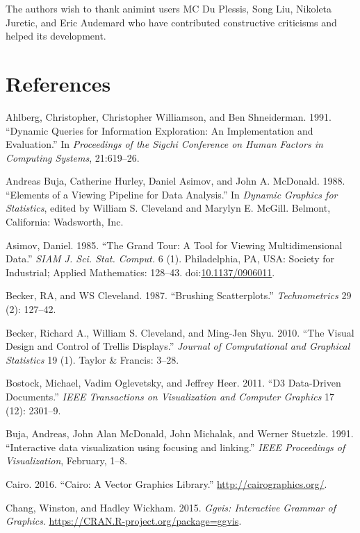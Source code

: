 \documentclass[12pt,]{article}
\theoremstyle{definition}
\theoremstyle{definition}
\theoremstyle{remark}
\begin{document}
The authors wish to thank animint users MC Du Plessis, Song Liu,
Nikoleta Juretic, and Eric Audemard who have contributed constructive
criticisms and helped its development.

\section*{References}

\hypertarget{refs}{}
\hypertarget{ref-Ahlberg:1991}{}
Ahlberg, Christopher, Christopher Williamson, and Ben Shneiderman. 1991.
``Dynamic Queries for Information Exploration: An Implementation and
Evaluation.'' In \emph{Proceedings of the Sigchi Conference on Human
Factors in Computing Systems}, 21:619--26.

\hypertarget{ref-viewing-pipeline}{}
Andreas Buja, Catherine Hurley, Daniel Asimov, and John A. McDonald.
1988. ``Elements of a Viewing Pipeline for Data Analysis.'' In
\emph{Dynamic Graphics for Statistics}, edited by William S. Cleveland
and Marylyn E. McGill. Belmont, California: Wadsworth, Inc.

\hypertarget{ref-grand-tour}{}
Asimov, Daniel. 1985. ``The Grand Tour: A Tool for Viewing
Multidimensional Data.'' \emph{SIAM J. Sci. Stat. Comput.} 6 (1).
Philadelphia, PA, USA: Society for Industrial; Applied Mathematics:
128--43. doi:\href{https://doi.org/10.1137/0906011}{10.1137/0906011}.

\hypertarget{ref-brushing-scatterplots}{}
Becker, RA, and WS Cleveland. 1987. ``Brushing Scatterplots.''
\emph{Technometrics} 29 (2): 127--42.

\hypertarget{ref-trellis}{}
Becker, Richard A., William S. Cleveland, and Ming-Jen Shyu. 2010. ``The
Visual Design and Control of Trellis Displays.'' \emph{Journal of
Computational and Graphical Statistics} 19 (1). Taylor \& Francis:
3--28.

\hypertarget{ref-d3}{}
Bostock, Michael, Vadim Oglevetsky, and Jeffrey Heer. 2011. ``D3
Data-Driven Documents.'' \emph{IEEE Transactions on Visualization and
Computer Graphics} 17 (12): 2301--9.

\hypertarget{ref-Buja:1991vh}{}
Buja, Andreas, John Alan McDonald, John Michalak, and Werner Stuetzle.
1991. ``Interactive data visualization using focusing and linking.''
\emph{IEEE Proceedings of Visualization}, February, 1--8.

\hypertarget{ref-cairo}{}
Cairo. 2016. ``Cairo: A Vector Graphics Library.''
\url{http://cairographics.org/}.

\hypertarget{ref-ggvis}{}
Chang, Winston, and Hadley Wickham. 2015. \emph{Ggvis: Interactive
Grammar of Graphics}. \url{https://CRAN.R-project.org/package=ggvis}.
\end{document}
